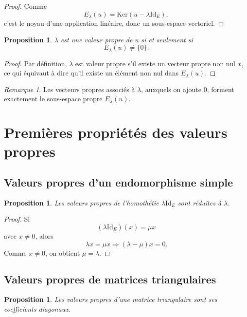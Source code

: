 \documentclass[11pt,a4paper]{article}
\newtheorem{proposition}[definition]{Proposition}
\theoremstyle{remark}
\newtheorem{remarque}[definition]{Remarque}
\newcommand{\Ker}{\mathrm{Ker}}
\newcommand{\id}{\mathrm{Id}}
\begin{document}
\begin{proof}
Comme
\[
E_\lambda(u)=\Ker(u-\lambda\id_E),
\]
c’est le noyau d’une application linéaire, donc un sous-espace vectoriel.
\end{proof}

\begin{proposition}
\(\lambda\) est une valeur propre de \(u\) si et seulement si
\[
E_\lambda(u)\neq \{0\}.
\]
\end{proposition}

\begin{proof}
Par définition, \(\lambda\) est valeur propre s’il existe un vecteur propre non nul \(x\), ce qui équivaut à dire qu’il existe un élément non nul dans \(E_\lambda(u)\).
\end{proof}

\begin{remarque}
Les vecteurs propres associés à \(\lambda\), auxquels on ajoute \(0\), forment exactement le sous-espace propre \(E_\lambda(u)\).
\end{remarque}

\section{Premières propriétés des valeurs propres}

\subsection{Valeurs propres d’un endomorphisme simple}

\begin{proposition}
Les valeurs propres de l’homothétie \(\lambda\id_E\) sont réduites à \(\lambda\).
\end{proposition}

\begin{proof}
Si
\[
(\lambda \id_E)(x)=\mu x
\]
avec \(x\neq 0\), alors
\[
\lambda x=\mu x
\Longrightarrow
(\lambda-\mu)x=0.
\]
Comme \(x\neq 0\), on obtient \(\mu=\lambda\).
\end{proof}

\subsection{Valeurs propres de matrices triangulaires}

\begin{proposition}
Les valeurs propres d’une matrice triangulaire sont ses coefficients diagonaux.
\end{proposition}
\end{document}
